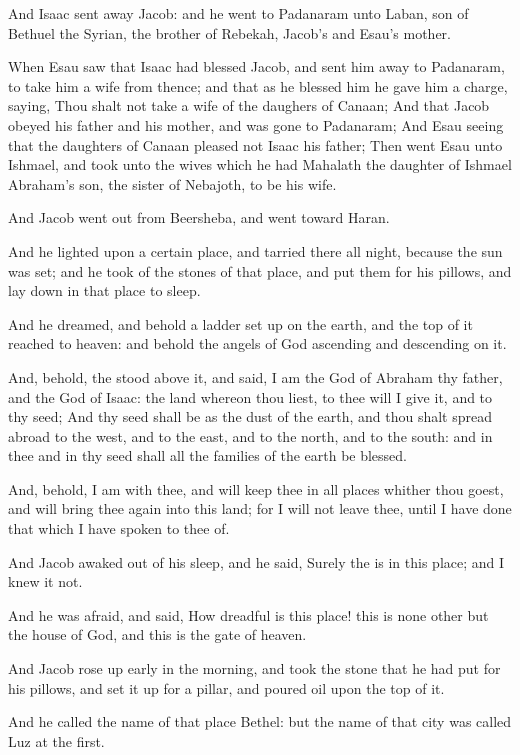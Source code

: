 \Verse And Isaac sent away Jacob: and he went to Padanaram unto Laban, son of Bethuel the Syrian, the brother of Rebekah, Jacob's and Esau's mother.

\Verse When Esau saw that Isaac had blessed Jacob, and sent him away to Padanaram, to take him a wife from thence; and that as he blessed him he gave him a charge, saying, Thou shalt not take a wife of the daughers of Canaan; \Verse And that Jacob obeyed his father and his mother, and was gone to Padanaram; \Verse And Esau seeing that the daughters of Canaan pleased not Isaac his father; \Verse Then went Esau unto Ishmael, and took unto the wives which he had Mahalath the daughter of Ishmael Abraham's son, the sister of Nebajoth, to be his wife.

\Verse And Jacob went out from Beersheba, and went toward Haran.

\Verse And he lighted upon a certain place, and tarried there all night, because the sun was set; and he took of the stones of that place, and put them for his pillows, and lay down in that place to sleep.

\Verse And he dreamed, and behold a ladder set up on the earth, and the top of it reached to heaven: and behold the angels of God ascending and descending on it.

\Verse And, behold, the \LORD stood above it, and said, I am the \LORD God of Abraham thy father, and the God of Isaac: the land whereon thou liest, to thee will I give it, and to thy seed; \Verse And thy seed shall be as the dust of the earth, and thou shalt spread abroad to the west, and to the east, and to the north, and to the south: and in thee and in thy seed shall all the families of the earth be blessed.

\Verse And, behold, I am with thee, and will keep thee in all places whither thou goest, and will bring thee again into this land; for I will not leave thee, until I have done that which I have spoken to thee of.

\Verse And Jacob awaked out of his sleep, and he said, Surely the \LORD is in this place; and I knew it not.

\Verse And he was afraid, and said, How dreadful is this place! this is none other but the house of God, and this is the gate of heaven.

\Verse And Jacob rose up early in the morning, and took the stone that he had put for his pillows, and set it up for a pillar, and poured oil upon the top of it.

\Verse And he called the name of that place Bethel: but the name of that city was called Luz at the first.


